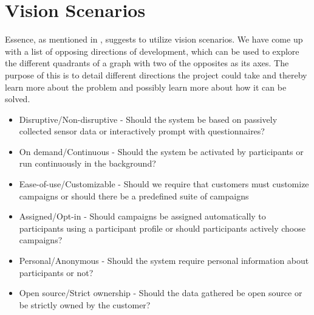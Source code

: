 \section{Vision Scenarios}
\label{sec:vision_scenarios}

Essence, as mentioned in , suggests to utilize vision scenarios. We have come up with a list of opposing directions of development, which can be used to explore the different quadrants of a graph with two of the opposites as its axes. The purpose of this is to detail different directions the project could take and thereby learn more about the problem and possibly learn more about how it can be solved. 

\begin{itemize}
	\setlength\itemsep{-0.2em}
    \item Disruptive/Non-disruptive - Should the system be based on passively collected sensor data or interactively prompt with questionnaires? %
    \item On demand/Continuous - Should the system be activated by participants or run continuously in the background? %
    \item Ease-of-use/Customizable - Should we require that customers must customize campaigns or should there be a predefined suite of campaigns %
    \item Assigned/Opt-in - Should campaigns be assigned automatically to participants using a participant profile or should participants actively choose campaigns? %
    \item Personal/Anonymous - Should the system require personal information about participants or not? %
    \item Open source/Strict ownership - Should the data gathered be open source or be strictly owned by the customer? %
\end{itemize}

